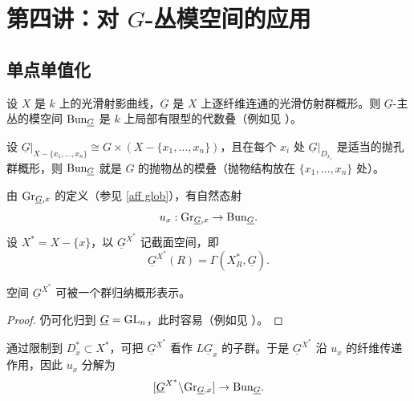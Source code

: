 
\section{第四讲：对 $G$-丛模空间的应用}\label{Lecture IV}

\subsection{单点单值化}\label{one point uniformization}

设 $X$ 是 $k$ 上的光滑射影曲线，$\underline G$ 是 $X$ 上逐纤维连通的光滑仿射群概形。则 $\underline G$-主丛的模空间 ${\operatorname{Bun}}_{\underline G}$ 是 $k$ 上局部有限型的代数叠（例如见 \cite[Proposition 1]{He}）。

\begin{ex}
设 $\underline G|_{X-\{x_1,\ldots,x_n\}}\cong G\times (X-\{x_1,\ldots,x_n\})$，且在每个 $x_i$ 处 $\underline G|_{D_{x_i}}$ 是适当的抛孔群概形，则 ${\operatorname{Bun}}_{\underline G}$ 就是 $G$ 的抛物丛的模叠（抛物结构放在 $\{x_1,\ldots,x_n\}$ 处）。
\end{ex}

由 ${\operatorname{Gr}}_{\underline G,x}$ 的定义（参见 \eqref{aff glob}），有自然态射
\begin{equation}\label{one pt uni map}
u_x: {\operatorname{Gr}}_{\underline G,x}\to {\operatorname{Bun}}_{\underline G}.
\end{equation}
设 $X^*=X-\{x\}$，以 $\underline G^{X^*}$ 记截面空间，即
\begin{equation}\label{Gout}
\underline G^{X^*}(R)=\Gamma(X_R^*,\underline G).
\end{equation}

\begin{lem}\label{rep of Gout}
空间 $\underline G^{X^*}$ 可被一个群归纳概形表示。
\end{lem}

\begin{proof}
仍可化归到 $\underline G={\operatorname{GL}}_n$，此时容易（例如见 \cite[(1.9)]{BL}）。
\end{proof}

通过限制到 $D_x^*\subset X^*$，可把 $\underline G^{X^*}$ 看作 $L\underline G_x$ 的子群。于是 $\underline G^{X^*}$ 沿 $u_x$ 的纤维传递作用，因此 $u_x$ 分解为
\begin{equation}\label{1pt uniform}
[\underline G^{X^*}\backslash{\operatorname{Gr}}_{\underline G,x}]\to {\operatorname{Bun}}_{\underline G}.
\end{equation}

